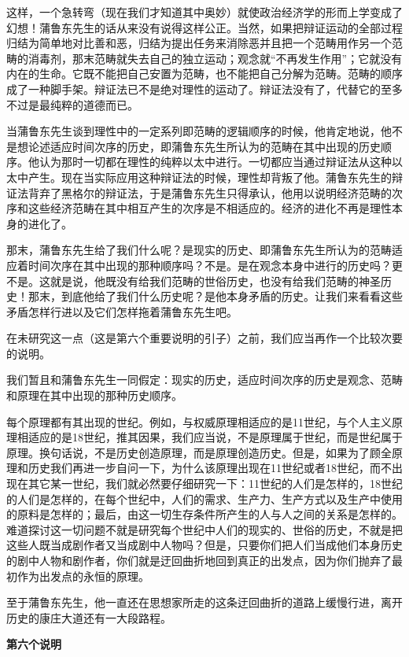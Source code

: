 \documentclass[a4paper,twoside,12pt,AutoFakeBold]{ctexart}
\begin{document}
这样，一个急转弯（现在我们才知道其中奥妙）就使政治经济学的形而上学变成了幻想！蒲鲁东先生的话从来没有说得这样公正。当然，如果把辩证运动的全部过程归结为简单地对比善和恶，归结为提出任务来消除恶并且把一个范畴用作另一个范畴的消毒剂，那末范畴就失去自己的独立运动；观念就“不再发生作用”；它就没有内在的生命。它既不能把自己安置为范畴，也不能把自己分解为范畴。范畴的顺序成了一种脚手架。辩证法已不是绝对理性的运动了。辩证法没有了，代替它的至多不过是最纯粹的道德而已。

当蒲鲁东先生谈到理性中的一定系列即范畴的逻辑顺序的时候，他肯定地说，他不是想论述适应时间次序的历史，即蒲鲁东先生所认为的范畴在其中出现的历史顺序。他认为那时一切都在理性的纯粹以太中进行。一切都应当通过辩证法从这种以太中产生。现在当实际应用这种辩证法的时候，理性却背叛了他。蒲鲁东先生的辩证法背弃了黑格尔的辩证法，于是蒲鲁东先生只得承认，他用以说明经济范畴的次序和这些经济范畴在其中相互产生的次序是不相适应的。经济的进化不再是理性本身的进化了。

那末，蒲鲁东先生给了我们什么呢？是现实的历史、即蒲鲁东先生所认为的范畴适应着时间次序在其中出现的那种顺序吗？不是。是在观念本身中进行的历史吗？更不是。这就是说，他既没有给我们范畴的世俗历史，也没有给我们范畴的神圣历史！那末，到底他给了我们什么历史呢？是他本身矛盾的历史。让我们来看看这些矛盾怎样行进以及它们怎样拖着蒲鲁东先生吧。

在未研究这一点（这是第六个重要说明的引子）之前，我们应当再作一个比较次要的说明。

我们暂且和蒲鲁东先生一同假定：现实的历史，适应时间次序的历史是观念、范畴和原理在其中出现的那种历史顺序。

每个原理都有其出现的世纪。例如，与权威原理相适应的是11世纪，与个人主义原理相适应的是18世纪，推其因果，我们应当说，不是原理属于世纪，而是世纪属于原理。换句话说，不是历史创造原理，而是原理创造历史。但是，如果为了顾全原理和历史我们再进一步自问一下，为什么该原理出现在11世纪或者18世纪，而不出现在其它某一世纪，我们就必然要仔细研究一下：11世纪的人们是怎样的，18世纪的人们是怎样的，在每个世纪中，人们的需求、生产力、生产方式以及生产中使用的原料是怎样的；最后，由这一切生存条件所产生的人与人之间的关系是怎样的。难道探讨这一切问题不就是研究每个世纪中人们的现实的、世俗的历史，不就是把这些人既当成剧作者又当成剧中人物吗？但是，只要你们把人们当成他们本身历史的剧中人物和剧作者，你们就是迂回曲折地回到真正的出发点，因为你们抛弃了最初作为出发点的永恒的原理。

至于蒲鲁东先生，他一直还在思想家所走的这条迂回曲折的道路上缓慢行进，离开历史的康庄大道还有一大段路程。

\begin{center}
    \textbf{第六个说明}
\end{center}
\end{document}

